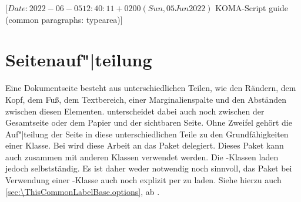 %
%
%
%
%
%
%

                 [$Date: 2022-06-05 12:40:11 +0200 (Sun, 05 Jun 2022) $
                  KOMA-Script guide (common paragraphs: typearea)]


\section{\texorpdfstring{Seitenauf"|teilung}{Seitenaufteilung}}
\BeginIndexGroup
{}

Eine Dokumentseite besteht aus unterschiedlichen Teilen, wie den Rändern, dem
Kopf, dem Fuß, dem Textbereich, einer Marginalienspalte und den Abständen
zwischen diesen Elementen. \KOMAScript{} unterscheidet dabei auch noch
zwischen der Gesamtseite oder dem Papier und der sichtbaren Seite. Ohne
Zweifel gehört die Auf"|teilung der Seite in diese unterschiedlichen Teile zu
den Grundfähigkeiten einer
Klasse. Bei \KOMAScript{}
wird diese Arbeit an das Paket
\hyperref[cha:typearea]{}
delegiert. Dieses Paket kann auch zusammen mit anderen Klassen verwendet
werden. Die \KOMAScript-Klassen laden
\hyperref[cha:typearea]{} jedoch selbstständig. Es ist daher
weder notwendig noch sinnvoll, das Paket bei Verwendung einer
\KOMAScript-Klasse auch noch explizit per  zu laden. Siehe
hierzu auch \autoref{sec:\ThisCommonLabelBase.options}, ab
.

